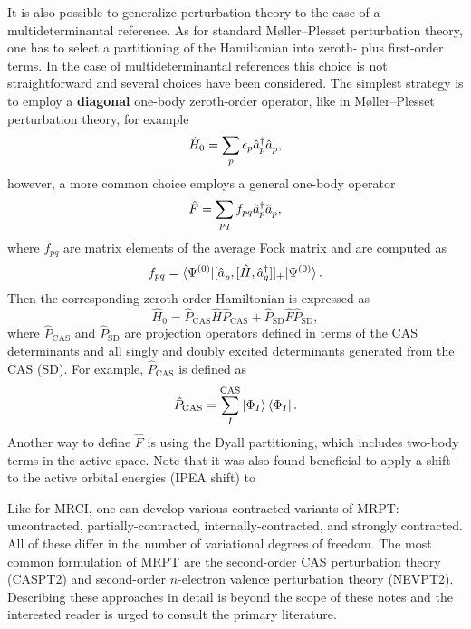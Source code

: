 \documentclass[../Main/chem532-notes.tex]{subfiles}
\begin{document}
It is also possible to generalize perturbation theory to the case of a multideterminantal reference.
As for standard M{\o}ller--Plesset perturbation theory, one has to select a partitioning of the Hamiltonian into zeroth- plus first-order terms.
In the case of multideterminantal references this choice is not straightforward and several choices have been considered.
The simplest strategy is to employ a \textbf{diagonal} one-body zeroth-order operator, like in M{\o}ller--Plesset perturbation theory, for example
\begin{equation}
\hat{H}_0 = \sum_{p} \epsilon_p \hat{a}_{p}^{\dagger}\hat{a}_{p}^{\,},
\end{equation}
however, a more common choice employs a general one-body operator
\begin{equation}
\hat{F} = \sum_{pq} f_{pq} \hat{a}_{p}^{\dagger}\hat{a}_{p}^{\,},
\end{equation}
where $ f_{pq}$ are matrix elements of the average Fock matrix and are computed as
\begin{equation}
 f_{pq} = \braket{\Psi^{(0)} | [\hat{a}_{p}^{\,}, [\hat{H},\hat{a}_{q}^{\dagger}]]_+|\Psi^{(0)}}.
 \end{equation}
 Then the corresponding zeroth-order Hamiltonian is expressed as
 \begin{equation}
\hat{H}_0 = \hat{P}_\mathrm{CAS} \hat{H} \hat{P}_\mathrm{CAS} 
+ \hat{P}_\mathrm{SD} \hat{F} \hat{P}_\mathrm{SD},
\end{equation}
where $\hat{P}_\mathrm{CAS}$ and $\hat{P}_\mathrm{SD}$ are projection operators defined in terms of the CAS determinants and all singly and doubly excited determinants generated from the CAS (SD). For example, $\hat{P}_\mathrm{CAS}$ is defined as
\begin{equation}
\hat{P}_\mathrm{CAS} = \sum_I^\mathrm{CAS} \ket{\Phi_I}\bra{\Phi_I}.
\end{equation}
Another way to define $\hat{F}$ is using the Dyall partitioning, which includes two-body terms in the active space.
Note that it was also found beneficial to apply a shift to the active orbital energies (IPEA shift) to 

Like for MRCI, one can develop various contracted variants of MRPT: uncontracted, partially-contracted, internally-contracted, and strongly contracted. All of these differ in the number of variational degrees of freedom.
The most common formulation of MRPT are the second-order CAS perturbation theory (CASPT2) and second-order $n$-electron valence perturbation theory (NEVPT2).
Describing these approaches in detail is beyond the scope of these notes and the interested reader is urged to consult the primary literature.
\end{document}
